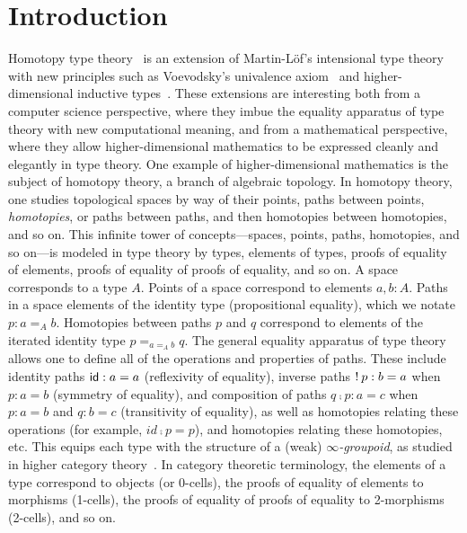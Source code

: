 \newcommand\Z{\ensuremath{\mathbb{Z}}}

\section{Introduction}

Homotopy type theory~\citep{...} is an extension of Martin-L\"of's
intensional type theory with new principles such as Voevodsky's
univalence axiom~\citep{...} and higher-dimensional inductive
types~\citep{...}.  These extensions are interesting both from a
computer science perspective, where they imbue the equality apparatus of
type theory with new computational meaning, and from a mathematical
perspective, where they allow higher-dimensional mathematics to be
expressed cleanly and elegantly in type theory.  One example of
higher-dimensional mathematics is the subject of homotopy theory, a
branch of algebraic topology.  In homotopy theory, one studies
topological spaces by way of their points, paths between points,
\emph{homotopies}, or paths between paths, and then homotopies between
homotopies, and so on.  This infinite tower of concepts---spaces,
points, paths, homotopies, and so on---is modeled in type theory by
types, elements of types, proofs of equality of elements, proofs of
equality of proofs of equality, and so on.  A space corresponds to a
type $A$. Points of a space correspond to elements $a,b : A$. Paths in a
space elements of the identity type (propositional equality), which we
notate $p : a =_A b$.  Homotopies between paths $p$ and $q$ correspond
to elements of the iterated identity type $p =_{a =_A b} q$.  The
general equality apparatus of type theory allows one to define all of
the operations and properties of paths.  These include identity paths
$\mathsf{id} : a = a$ (reflexivity of equality), inverse paths $! \: p : b
= a$ when $p : a = b$ (symmetry of equality), and composition of paths
$q \comp p : a = c$ when $p : a = b$ and $q : b = c$ (transitivity of
equality), as well as homotopies relating these operations (for example,
$id \comp p = p$), and homotopies relating these homotopies, etc.  This
equips each type with the structure of a (weak)
\emph{$\infty$-groupoid}, as studied in higher category
theory~\citep{...}.  In category theoretic terminology, the elements of
a type correspond to objects (or 0-cells), the proofs of equality of
elements to morphisms (1-cells), the proofs of equality of proofs of
equality to 2-morphisms (2-cells), and so on.

